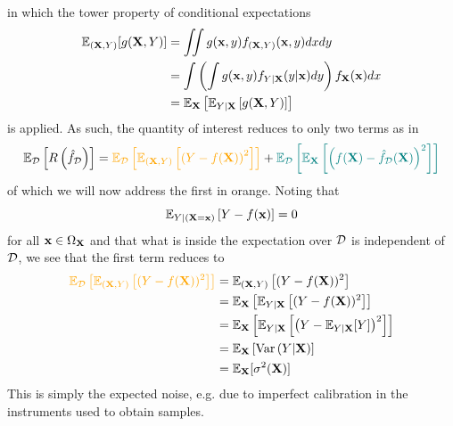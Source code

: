 \documentclass[11pt]{article}
\begin{document}
in which the tower property of conditional expectations
\begin{align*}
    \mathbb{E}_{(\mathbf{X},Y)}[g(\mathbf{X},Y)]
    &=
    \iint g(\mathbf{x},y)f_{(\mathbf{X},Y)}(\mathbf{x},y)dxdy\\
    &=
    \int \left(\int g(\mathbf{x},y)f_{Y|\mathbf{X}}(y|\mathbf{x})dy\right)f_{\mathbf{X}}(\mathbf{x})dx\\
    &=
    \mathbb{E}_{\mathbf{X}}\left[\mathbb{E}_{Y|\mathbf{X}}\left[g(\mathbf{X},Y)\right]\right]
\end{align*}
is applied. As such, the quantity of interest reduces to only two terms as in
$$
\E_{\D}\l[R\l(\hat{f}_{\D}\r)\r]
=
\textcolor{myYellow}{\E_{\D}\l[\E_{(\X,Y)}\l[\l(Y-f(\X)\r)^2\r]\r]}+\textcolor{myGreen}{\E_{\D}\l[\E_\X\l[\l(f(\X)-\hat{f}_{\D}(\X)\r)^2\r]\r]}
$$
of which we will now address the first in orange. Noting that
$$
\mathbb{E}_{Y|(\mathbf{X}=\mathbf{x})}\left[Y-f(\mathbf{x})\right]
=
0
$$
for all $\mathbf{x}\in\Omega_{\mathbf{X}}$ and that what is inside the expectation over $\mathcal{D}$ is independent of $\mathcal{D}$, we see that the first term reduces to
\begin{align*}
    \textcolor{myYellow}{\E_{\D}\l[\E_{(\X,Y)}\l[(Y-f(\X))^2\r]\r]}
    &=
    \E_{(\X,Y)}\l[(Y-f(\X))^2\r]\\
    &=
    \E_\X\l[\E_{Y|\X}\l[(Y-f(\X))^2\r]\r]\\
    &=
    \E_\X\l[\E_{Y|\X}\l[\l(Y-\E_{Y|\X}[Y]\r)^2\r]\r]\\
    &=
    \E_\X\l[\text{Var}\l(Y|\X\r)\r]\\
    &=
    \E_\X[\sigma^2(\X)]
\end{align*}
This is simply the expected noise, e.g. due to imperfect calibration in the instruments used to obtain samples.
\end{document}
